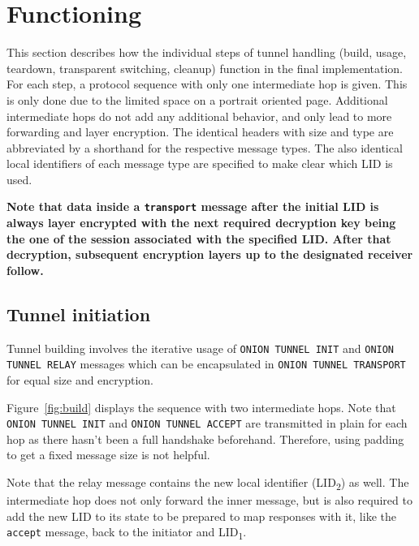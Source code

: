 \documentclass[paper=letter, fontsize=12pt]{article}
\begin{document}
\section{Functioning}
This section describes how the individual steps of tunnel handling (build, usage, teardown, transparent switching, cleanup) function in the final implementation. For each step, a protocol sequence with only one intermediate hop is given. This is only done due to the limited space on a portrait oriented page. Additional intermediate hops do not add any additional behavior, and only lead to more forwarding and layer encryption.
The identical headers with size and type are abbreviated by a shorthand for the respective message types. The also identical local identifiers of each message type are specified to make clear which LID is used. 

\textbf{Note that data inside a \texttt{transport} message after the initial LID is always layer encrypted with the next required decryption key being the one of the session associated with the specified LID. After that decryption, subsequent encryption layers up to the designated receiver follow.}

\subsection{Tunnel initiation}
\label{sec:function:build}
Tunnel building involves the iterative usage of \texttt{ONION TUNNEL INIT} and \texttt{ONION TUNNEL RELAY} messages which can be encapsulated in \texttt{ONION TUNNEL TRANSPORT} for equal size and encryption.

Figure~\ref{fig:build} displays the sequence with two intermediate hops. Note that \texttt{ONION TUNNEL INIT} and \texttt{ONION TUNNEL ACCEPT} are transmitted in plain for each hop as there hasn't been a full handshake beforehand. Therefore, using padding to get a fixed message size is not helpful.

Note that the relay message contains the new local identifier (LID\textsubscript{2}) as well. The intermediate hop does not only forward the inner message, but is also required to add the new LID to its state to be prepared to map responses with it, like the \texttt{accept} message, back to the initiator and LID\textsubscript{1}.
\end{document}

